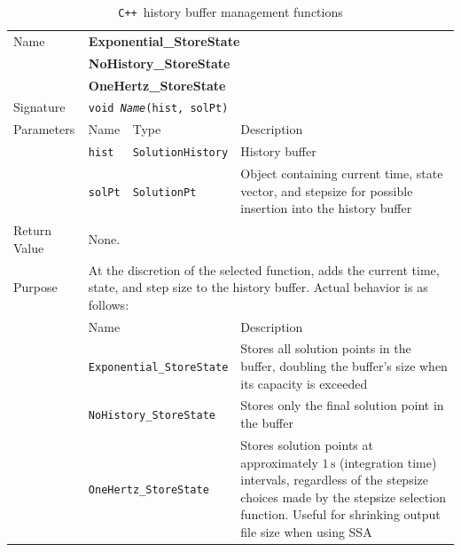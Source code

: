 \documentclass[12pt]{article}
\newcommand{\cpp}{\texttt{C++}}%
\newcommand{\api}[1]{\texttt{#1}}
\newcommand{\srccode}[1]{\texttt{#1}}
\newcommand{\unitqty}[2]{#1\,\mathrm{#2}}
\begin{document}
\begin{table}%
  \begin{center}
    \caption{\cpp\ history buffer management functions} \label{cpp_history_tab}
    \begin{tabular}{|p{0.75in}|p{0.5in}|p{1.125in}|p{2.625in}|}
      \hline
      Name  & \multicolumn{3}{p{4.5in}|}{\textbf{Exponential\_StoreState}} \\
            & \multicolumn{3}{p{4.5in}|}{\textbf{NoHistory\_StoreState}} \\
            & \multicolumn{3}{p{4.5in}|}{\textbf{OneHertz\_StoreState}} \\
      \hline
      Signature & \multicolumn{3}{l|}{
          \srccode{void \emph{Name}(hist, solPt)}} \\
      \hline
      Parameters &  Name & Type & Description \\
      \cline{2-4}
                 &  \srccode{hist} & \srccode{Solution\-History} &
                       History buffer \\
                 &  \srccode{solPt} & \srccode{SolutionPt} &
                       Object containing current time, state vector, and stepsize
                       for possible insertion into the history buffer \\
      \hline
      Return Value & \multicolumn{3}{l|}{None.} \\
      \hline
      Purpose & \multicolumn{3}{p{4.5in}|}{ At the discretion of the selected
                function, adds the current time, state, and step size to the
                history buffer.  Actual behavior is as follows:} \\
      \cline{2-4}
              & \multicolumn{2}{l|}{Name} & Description \\
      \cline{2-4}
              & \multicolumn{2}{l|}{\api{Exponential\_StoreState}} &
                Stores all solution points in the buffer, doubling the
                buffer's size when its capacity is exceeded \\
              & \multicolumn{2}{l|}{\api{NoHistory\_StoreState}} &
                Stores only the final solution point in the buffer \\
              & \multicolumn{2}{l|}{\api{OneHertz\_StoreState}} &
                Stores solution points at approximately $\unitqty{1}{s}$
                (integration time) intervals, regardless of the stepsize
                choices made by the stepsize selection function.  Useful
                for shrinking output file size when using SSA \\
      \hline
    \end{tabular}
  \end{center}
\end{table}
\end{document}
